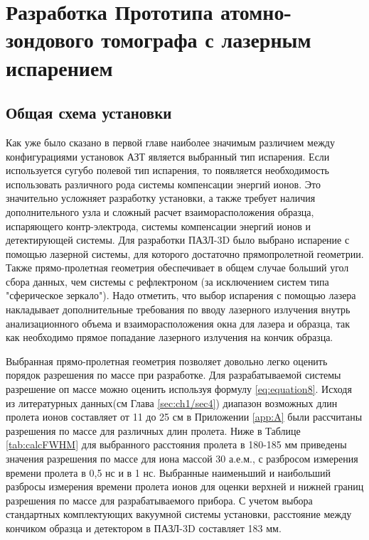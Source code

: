 \chapter{Разработка  Прототипа атомно-зондового томографа с лазерным испарением}\label{ch:ch2}


\section{Общая схема установки}\label{sec:ch2/sec1}

Как уже было сказано в первой главе наиболее значимым различием между конфигурациями установок АЗТ является выбранный тип испарения. Если используется сугубо полевой тип испарения, то появляется необходимость использовать различного рода системы компенсации энергий ионов. Это значительно усложняет разработку установки, а также требует наличия дополнительного узла и сложный расчет взаиморасположения образца, испаряющего контр-электрода, системы компенсации энергий ионов и детектирующей системы. Для разработки ПАЗЛ-3D \cite{scbibAPPLE} было выбрано испарение с помощью лазерной системы, для которого достаточно прямопролетной геометрии. Также прямо-пролетная геометрия обеспечивает в общем случае больший угол сбора данных, чем системы с рефлектроном (за исключением систем типа "сферическое зеркало"). Надо отметить, что выбор испарения с помощью лазера накладывает дополнительные требования по вводу лазерного излучения внутрь анализационного объема и взаиморасположения окна для лазера и образца, так как необходимо прямое попадание лазерного излучения на кончик образца.

Выбранная прямо-пролетная геометрия позволяет довольно легко оценить порядок разрешения по массе при разработке. Для разрабатываемой системы разрешение оп массе можно оценить используя формулу \cref{eq:equation8}. Исходя из литературных данных(см Глава \cref{sec:ch1/sec4}) диапазон возможных длин пролета ионов составляет от 11 до 25 см в Приложении \cref{app:A} были рассчитаны разрешения по массе для различных длин пролета. Ниже в Таблице \cref{tab:calcFWHM} для выбранного расстояния пролета в 180-185 мм приведены значения разрешения по массе для иона массой 30 а.е.м., с разбросом измерения времени пролета в 0,5 нс и в 1 нс. Выбранные наименьший и наибольший разбросы измерения времени пролета ионов для оценки верхней и нижней границ разрешения по массе для разрабатываемого прибора. С учетом выбора стандартных комплектующих вакуумной системы установки, расстояние между кончиком образца и детектором в ПАЗЛ-3D составляет 183 мм.

